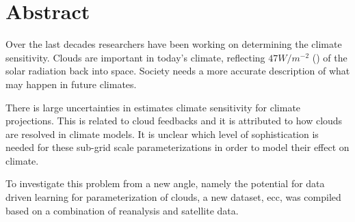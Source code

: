 \chapter*{Abstract}

Over the last decades researchers have been working on determining the climate sensitivity. %
Clouds are important in today's climate, reflecting $47W/m^{-2}$ (\cite{Wild2019TheModels}) of the solar radiation back into space. Society needs a more accurate description of what may happen in future climates.

There is large uncertainties in estimates climate sensitivity for climate projections. This is related to cloud feedbacks and it is attributed to how clouds are resolved in climate models. %
It is unclear which level of sophistication is needed for these sub-grid scale parameterizations in order to model their effect on climate.

To investigate this problem from a new angle,  namely the potential for data driven learning for parameterization of clouds, a new dataset, \acrfull{ecc}, was compiled based on a combination of reanalysis and satellite data. 

